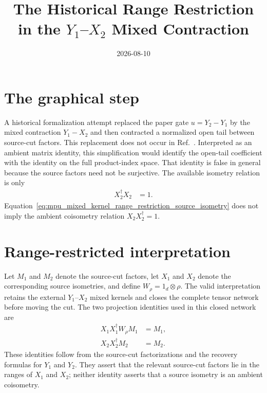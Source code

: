 \documentclass{article}
\title{The Historical Range Restriction in the $Y_1$--$X_2$ Mixed Contraction}
\author{}
\date{2026-08-10}
\begin{document}
\maketitle
{}

\section{The graphical step}

A historical formalization attempt replaced the paper gate
$u=Y_2\mathbin{-}Y_1$ by the mixed contraction $Y_1\mathbin{-}X_2$ and then
contracted a normalized open tail between source-cut factors. This replacement
does not occur in Ref.~\cite[lines~536--557]{Cirac2017MPU}. Interpreted
as an ambient matrix identity, this simplification would identify the
open-tail coefficient with the identity on the full product-index space. That
identity is false in general because the source factors need not be
surjective. The available isometry relation is only
\begin{align}
    X_2^\dagger X_2
        &= 1.
    \label{eq:mpu_mixed_kernel_range_restriction_source_isometry}
\end{align}
Equation~\ref{eq:mpu_mixed_kernel_range_restriction_source_isometry} does not imply
the ambient coisometry relation $X_2X_2^\dagger=1$.

\section{Range-restricted interpretation}

Let $M_1$ and $M_2$ denote the source-cut factors, let $X_1$ and $X_2$ denote
the corresponding source isometries, and define
$W_\rho=1_d\otimes\rho$. The valid interpretation retains the external
$Y_1$--$X_2$ mixed kernels and closes the complete tensor network before
moving the cut. The two projection identities used in this closed network are
\begin{align}
    X_1X_1^\dagger W_\rho M_1
        &= M_1,
    \label{eq:mpu_mixed_kernel_range_restriction_first_range_identity}\\
    X_2X_2^\dagger M_2
        &= M_2.
    \label{eq:mpu_mixed_kernel_range_restriction_second_range_identity}
\end{align}
These identities follow from the source-cut factorizations and the recovery
formulas for $Y_1$ and $Y_2$. They assert that the relevant source-cut factors
lie in the ranges of $X_1$ and $X_2$; neither identity asserts that a source
isometry is an ambient coisometry.
\end{document}

